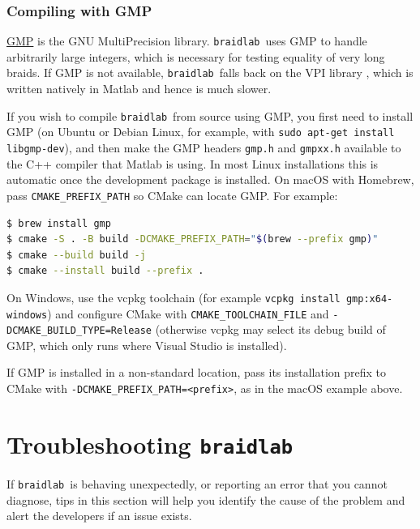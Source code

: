 \documentclass[12pt]{article}
\newcommand{\braidlab}{\texttt{braidlab}}%
\begin{document}
\subsubsection{Compiling with GMP}
\label{sec:gmp}

%
\href{https://gmplib.org/}{GMP} is the GNU MultiPrecision library.  \braidlab\
uses GMP to handle arbitrarily large integers, which is necessary for testing
equality of very long braids.  If GMP is not available, \braidlab\ falls back
on the VPI library \citep{vpi}, which is written natively in Matlab and hence
is much slower.

If you wish to compile \braidlab\ from source using GMP, you first need to
install GMP (on Ubuntu or Debian Linux, for example, with
\lstinline{sudo apt-get install libgmp-dev}), and then make the GMP headers
\lstinline{gmp.h} and \lstinline{gmpxx.h} available to the C++ compiler that
Matlab is using.  In most Linux installations this is automatic once the
development package is installed.  On macOS with Homebrew, pass
\lstinline{CMAKE_PREFIX_PATH} so CMake can locate GMP.
For example: %
\begin{lstlisting}[frame=single,framerule=0pt,escapechar=*,%
  language=bash,backgroundcolor=\color{white}]
$ brew install gmp
$ cmake -S . -B build -DCMAKE_PREFIX_PATH="$(brew --prefix gmp)"
$ cmake --build build -j
$ cmake --install build --prefix .
\end{lstlisting}
On Windows, use the vcpkg toolchain (for example
\lstinline{vcpkg install gmp:x64-windows}) and configure CMake with
\lstinline{CMAKE_TOOLCHAIN_FILE} and \lstinline{-DCMAKE_BUILD_TYPE=Release}
(otherwise vcpkg may select its debug build of GMP, which only runs where
Visual Studio is installed).

If GMP is installed in a non-standard location, pass its installation
prefix to CMake with \lstinline{-DCMAKE_PREFIX_PATH=<prefix>}, as in the
macOS example above.

%


\index{installing \braidlab!troubleshooting|)}


\section{Troubleshooting \braidlab}
\label{sec:troubleshooting}

%
If \braidlab\ is behaving unexpectedly, or reporting an error that you cannot
diagnose, tips in this section will help you identify the cause of the problem
and alert the developers if an issue exists.
\end{document}

